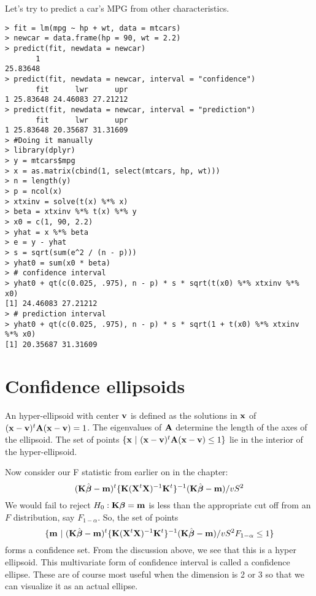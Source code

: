 Let's try to predict a car's MPG from other characteristics. 

\begin{verbatim}
> fit = lm(mpg ~ hp + wt, data = mtcars)
> newcar = data.frame(hp = 90, wt = 2.2)
> predict(fit, newdata = newcar)
       1 
25.83648 
> predict(fit, newdata = newcar, interval = "confidence")
       fit      lwr      upr
1 25.83648 24.46083 27.21212
> predict(fit, newdata = newcar, interval = "prediction")
       fit      lwr      upr
1 25.83648 20.35687 31.31609
> #Doing it manually
> library(dplyr)
> y = mtcars$mpg
> x = as.matrix(cbind(1, select(mtcars, hp, wt)))
> n = length(y)
> p = ncol(x)
> xtxinv = solve(t(x) %*% x)
> beta = xtxinv %*% t(x) %*% y
> x0 = c(1, 90, 2.2)
> yhat = x %*% beta
> e = y - yhat
> s = sqrt(sum(e^2 / (n - p)))
> yhat0 = sum(x0 * beta)
> # confidence interval
> yhat0 + qt(c(0.025, .975), n - p) * s * sqrt(t(x0) %*% xtxinv %*% x0)
[1] 24.46083 27.21212
> # prediction interval
> yhat0 + qt(c(0.025, .975), n - p) * s * sqrt(1 + t(x0) %*% xtxinv %*% x0)
[1] 20.35687 31.31609
\end{verbatim}


\section{Confidence ellipsoids}

An hyper-ellipsoid with center $\mathbf{v}$ is defined as the solutions in $\mathbf{x}$ of 
$(\mathbf{x} - \mathbf{v})^t \mathbf{A} (\mathbf{x} - \mathbf{v})=1$. The eigenvalues of $\mathbf{A}$ determine the length
of the axes of the ellipsoid. The set of points $\{\mathbf{x} ~|~ (\mathbf{x} - \mathbf{v})^t \mathbf{A} (\mathbf{x} - \mathbf{v}) \leq 1\}$
lie in the interior of the hyper-ellipsoid. 

Now consider our F statistic from earlier on in the chapter:
$$
(\mathbf{K} \hat {\boldsymbol{\beta}} - \mathbf{m})^t  \{\mathbf{K} (\mathbf{X}^t \mathbf{X})^{-1} \mathbf{K}^t\}^{-1} (\mathbf{K} \hat {\boldsymbol{\beta}} - \mathbf{m}) / v S^2
$$
We would fail to reject $H_0:\mathbf{K} \boldsymbol{\beta} = \mathbf{m}$ is less than the appropriate cut off 
from an $F$ distribution, say $F_{1-\alpha}$. So, the set of points
$$
\{\mathbf{m} ~|~ 
(\mathbf{K} \hat {\boldsymbol{\beta}} - \mathbf{m})^t  \{\mathbf{K} (\mathbf{X}^t \mathbf{X})^{-1} \mathbf{K}^t\}^{-1} (\mathbf{K} \hat {\boldsymbol{\beta}} - \mathbf{m}) / v S^2 F_{1-\alpha} \leq 1
\}
$$
forms a confidence set. From the discussion above, we see that this is a hyper ellipsoid.
This multivariate form of confidence interval is called a confidence ellipse. These are
of course most useful when the dimension is 2 or 3 so that we can visualize it as
an actual ellipse.


